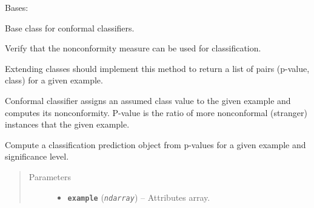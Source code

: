 \documentclass[letterpaper,10pt,english]{sphinxmanual}
\begin{document}
\begin{fulllineitems}
\label{cp.classification:cp.classification.ConformalClassifier}
Bases: {\hyperref[cp.base:cp.base.ConformalPredictor]{}}

Base class for conformal classifiers.

\begin{fulllineitems}
\label{cp.classification:cp.classification.ConformalClassifier.__init__}
Verify that the nonconformity measure can be used for classification.

\end{fulllineitems}


\begin{fulllineitems}
\label{cp.classification:cp.classification.ConformalClassifier.p_values}
Extending classes should implement this method to return a list of pairs (p-value, class)
for a given example.

Conformal classifier assigns an assumed class value to the given example and computes its nonconformity.
P-value is the ratio of more nonconformal (stranger) instances that the given example.

\end{fulllineitems}


\begin{fulllineitems}
\label{cp.classification:cp.classification.ConformalClassifier.predict}
Compute a classification prediction object from p-values for a given example and significance level.
\begin{quote}\begin{description}
\item[{Parameters}] \leavevmode\begin{itemize}
\item {} 
\textbf{\texttt{example}} (\emph{\texttt{ndarray}}) -- Attributes array.


\end{itemize}
\end{description}
\end{quote}
\end{fulllineitems}
\end{fulllineitems}
\end{document}
